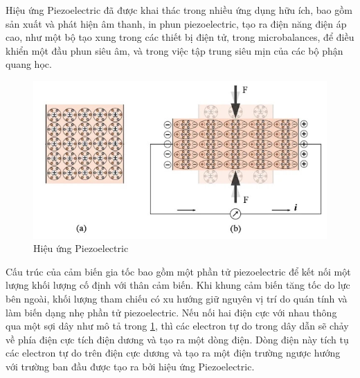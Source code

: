 \indent Hiệu ứng Piezoelectric đã được khai thác trong nhiều ứng dụng hữu ích, bao gồm sản xuất và phát hiện âm thanh, in phun piezoelectric, tạo ra điện năng điện áp cao, như một bộ tạo xung trong các thiết bị điện tử, trong microbalances, để điều khiển một đầu phun siêu âm, và trong việc tập trung siêu mịn của các bộ phận quang học.
\begin{figure}[H]
    \centering
    \includegraphics[width=\textwidth,height=\textheight,keepaspectratio]{Images/Theoretical basis/intro_piezo_accelerometers_figure_1.jpeg}
    \caption{Hiệu ứng Piezoelectric}
    \label{fig:pio_prin}
\end{figure}
\indent Cấu trúc của cảm biến gia tốc bao gồm một phần tử piezoelectric để kết nối một lượng khối lượng cố định với thân cảm biến. Khi khung cảm biến tăng tốc do lực bên ngoài, khối lượng tham chiếu có xu hướng giữ nguyên vị trí do quán tính và làm biến dạng nhẹ phần tử piezoelectric.
\indent Nếu nối hai điện cực với nhau thông qua một sợi dây như mô tả trong \ref{fig:pio_prin}, thì các electron tự do trong dây dẫn sẽ chảy về phía điện cực tích điện dương và tạo ra một dòng điện. Dòng điện này tích tụ các electron tự do trên điện cực dương và tạo ra một điện trường ngược hướng với trường ban đầu được tạo ra bởi hiệu ứng Piezoelectric.

